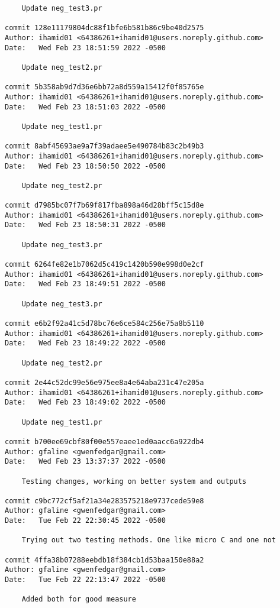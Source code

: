 {\begin{verbatim}
    Update neg_test3.pr

commit 128e11179804dc88f1bfe6b581b86c9be40d2575
Author: ihamid01 <64386261+ihamid01@users.noreply.github.com>
Date:   Wed Feb 23 18:51:59 2022 -0500

    Update neg_test2.pr

commit 5b358ab9d7d36e6bb72a8d559a15412f0f85765e
Author: ihamid01 <64386261+ihamid01@users.noreply.github.com>
Date:   Wed Feb 23 18:51:03 2022 -0500

    Update neg_test1.pr

commit 8abf45693ae9a7f39adaee5e490784b83c2b49b3
Author: ihamid01 <64386261+ihamid01@users.noreply.github.com>
Date:   Wed Feb 23 18:50:50 2022 -0500

    Update neg_test2.pr

commit d7985bc07f7b69f817fba898a46d28bff5c15d8e
Author: ihamid01 <64386261+ihamid01@users.noreply.github.com>
Date:   Wed Feb 23 18:50:31 2022 -0500

    Update neg_test3.pr

commit 6264fe82e1b7062d5c419c1420b590e998d0e2cf
Author: ihamid01 <64386261+ihamid01@users.noreply.github.com>
Date:   Wed Feb 23 18:49:51 2022 -0500

    Update neg_test3.pr

commit e6b2f92a41c5d78bc76e6ce584c256e75a8b5110
Author: ihamid01 <64386261+ihamid01@users.noreply.github.com>
Date:   Wed Feb 23 18:49:22 2022 -0500

    Update neg_test2.pr

commit 2e44c52dc99e56e975ee8a4e64aba231c47e205a
Author: ihamid01 <64386261+ihamid01@users.noreply.github.com>
Date:   Wed Feb 23 18:49:02 2022 -0500

    Update neg_test1.pr

commit b700ee69cbf80f00e557eaee1ed0aacc6a922db4
Author: gfaline <gwenfedgar@gmail.com>
Date:   Wed Feb 23 13:37:37 2022 -0500

    Testing changes, working on better system and outputs

commit c9bc772cf5af21a34e283575218e9737cede59e8
Author: gfaline <gwenfedgar@gmail.com>
Date:   Tue Feb 22 22:30:45 2022 -0500

    Trying out two testing methods. One like micro C and one not

commit 4ffa38b07288eebdb18f384cb1d53baa150e88a2
Author: gfaline <gwenfedgar@gmail.com>
Date:   Tue Feb 22 22:13:47 2022 -0500

    Added both for good measure


\end{verbatim}}
